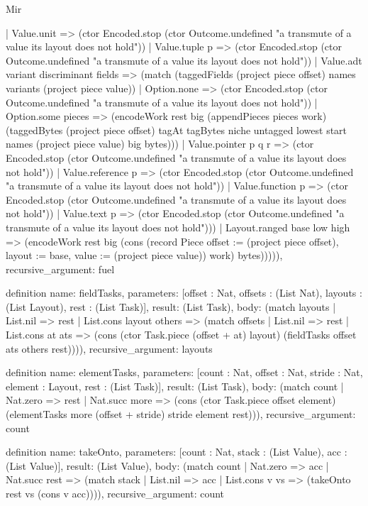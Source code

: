\begin{lexlean}{Mir}
\begin{semanticmodule}
{          | Value.unit => (ctor Encoded.stop (ctor Outcome.undefined "a transmute of a value its layout does not hold"))
          | Value.tuple p => (ctor Encoded.stop (ctor Outcome.undefined "a transmute of a value its layout does not hold"))
          | Value.adt variant discriminant fields => (match (taggedFields (project piece offset) names variants (project piece value))
            | Option.none => (ctor Encoded.stop (ctor Outcome.undefined "a transmute of a value its layout does not hold"))
            | Option.some pieces => (encodeWork rest big (appendPieces pieces work) (taggedBytes (project piece offset) tagAt tagBytes niche untagged lowest start names (project piece value) big bytes)))
          | Value.pointer p q r => (ctor Encoded.stop (ctor Outcome.undefined "a transmute of a value its layout does not hold"))
          | Value.reference p => (ctor Encoded.stop (ctor Outcome.undefined "a transmute of a value its layout does not hold"))
          | Value.function p => (ctor Encoded.stop (ctor Outcome.undefined "a transmute of a value its layout does not hold"))
          | Value.text p => (ctor Encoded.stop (ctor Outcome.undefined "a transmute of a value its layout does not hold")))
        | Layout.ranged base low high => (encodeWork rest big (cons (record Piece {offset := (project piece offset), layout := base, value := (project piece value)}) work) bytes))))),
  recursive_argument: fuel
}

definition{
  name: fieldTasks,
  parameters: [offset : Nat, offsets : (List Nat), layouts : (List Layout), rest : (List Task)],
  result: (List Task),
  body: (match layouts
    | List.nil => rest
    | List.cons layout others => (match offsets
      | List.nil => rest
      | List.cons at ats => (cons (ctor Task.piece (offset + at) layout) (fieldTasks offset ats others rest)))),
  recursive_argument: layouts
}

definition{
  name: elementTasks,
  parameters: [count : Nat, offset : Nat, stride : Nat, element : Layout, rest : (List Task)],
  result: (List Task),
  body: (match count
    | Nat.zero => rest
    | Nat.succ more => (cons (ctor Task.piece offset element) (elementTasks more (offset + stride) stride element rest))),
  recursive_argument: count
}

definition{
  name: takeOnto,
  parameters: [count : Nat, stack : (List Value), acc : (List Value)],
  result: (List Value),
  body: (match count
    | Nat.zero => acc
    | Nat.succ rest => (match stack
      | List.nil => acc
      | List.cons v vs => (takeOnto rest vs (cons v acc)))),
  recursive_argument: count
}


\end{semanticmodule}
\end{lexlean}
